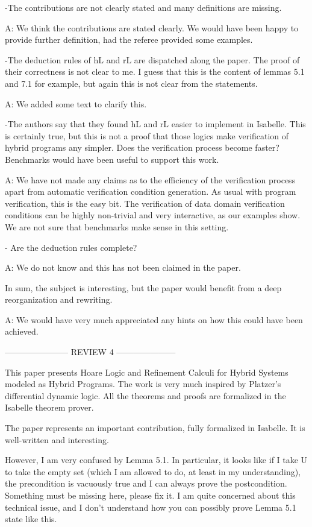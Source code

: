 \documentclass[envcountsame,envcountsect]{llncs}
\begin{document}
-The contributions are not clearly stated and many definitions are missing.

A: We think the contributions are stated clearly. We would have been happy to provide further definition, had the referee provided some examples.

-The deduction rules of hL and rL are dispatched along the paper. The proof of their correctness is not clear to me. I guess that this is the content of lemmas 5.1 and 7.1 for example, but again this is not clear from the statements.

A: We added some text to clarify this.

-The authors say that they found  hL and rL easier to implement in Isabelle. This is certainly true, but this is not a proof that those logics make verification of hybrid programs any simpler. Does the verification process become faster? Benchmarks would have been useful to support this work.

A: We have not made any claims as to the efficiency of the verification process apart from automatic verification condition generation. As usual with program verification, this is the easy bit. The verification of data domain verification conditions can be highly non-trivial and very interactive, as our examples show. We are not sure that benchmarks make sense in this setting.

- Are the deduction rules complete?

A: We do not know and this has not been claimed in the paper.

In sum, the subject is interesting, but the paper would benefit from a deep reorganization and rewriting.

A: We would have very much appreciated any hints on how this could have been achieved.


----------------------- REVIEW 4 ---------------------

This paper presents Hoare Logic and Refinement Calculi for Hybrid Systems modeled as Hybrid Programs. The work is very much inspired by Platzer's differential dynamic logic. All the theorems and proofs are formalized in the Isabelle theorem prover.

The paper represents an important contribution, fully formalized in Isabelle. It is well-written and interesting.

However, I am very confused by Lemma 5.1. In particular, it looks like if I take U to take the empty set (which I am allowed to do, at least in my understanding), the precondition is vacuously true and I can always prove the postcondition. Something must be missing here, please fix it. I am quite concerned about this technical issue, and I don't understand how you can possibly prove Lemma 5.1 state like this.
\end{document}
